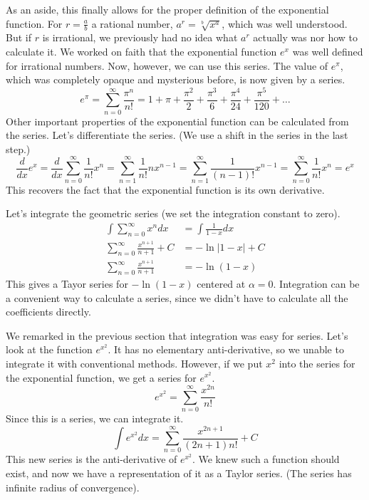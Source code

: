 \documentclass[fleqn]{report}
\begin{document}
As an aside, this finally allows for the proper definition of
the exponential function. For $r = \frac{a}{b}$ a rational
number, $a^r = \sqrt[b]{x^a}$, which was well understood. But
if $r$ is irrational, we previously had no idea what $a^r$
actually was nor how to calculate it. We worked on faith that
the exponential function $e^x$ was well defined for irrational
numbers. Now, however, we can use this series. The value of
$e^{\pi}$, which was completely opaque and mysterious before,
is now given by a series.
\begin{equation*}
e^{\pi} = \sum_{n=0}^\infty \frac{\pi^n}{n!} = 1 + \pi +
\frac{\pi^2}{2} + \frac{\pi^3}{6} + \frac{\pi^4}{24} +
\frac{\pi^5}{120} + \ldots
\end{equation*}
Other important properties of the exponential function can be
calculated from the series. Let's differentiate the series. (We
use a shift in the series in the last step.)
\begin{equation*}
\frac{d}{dx} e^x = \frac{d}{dx} \sum_{n=0}^\infty \frac{1}{n!}
x^n = \sum_{n=1}^\infty \frac{1}{n!} n x^{n-1} =
\sum_{n=1}^\infty \frac{1}{(n-1)!} x^{n-1} = \sum_{n=0}^\infty
\frac{1}{n!} x^n = e^x
\end{equation*}
This recovers the fact that the exponential function is its own
derivative.

\begin{example}
Let's integrate the geometric series (we set the integration
constant to zero).
\begin{align*}
\int \sum_{n=0}^\infty x^n dx & = \int \frac{1}{1-x} dx \\
\sum_{n=0}^\infty \frac{x^{n+1}}{n+1} + C & = -\ln |1-x| + C \\
\sum_{n=0}^\infty \frac{x^{n+1}}{n+1} 
& = -\ln (1-x) 
\end{align*}
This gives a Tayor series for $- \ln (1-x)$ centered at
$\alpha = 0$. Integration can be a convenient way to calculate a
series, since we didn't have to calculate all the coefficients
directly.
\end{example}

\begin{example}
We remarked in the previous section that integration was easy
for series. Let's look at the function $e^{x^2}$. It has no
elementary anti-derivative, so we unable to integrate it with
conventional methods. However, if we put $x^2$ into the series
for the exponential function, we get a series for $e^{x^2}$.
\begin{equation*}
e^{x^2} = \sum_{n=0}^\infty \frac{x^{2n}}{n!}
\end{equation*}
Since this is a series, we can integrate it.
\begin{equation*}
\int e^{x^2} dx = \sum_{n=0}^\infty \frac{x^{2n+1}}{(2n+1)n!} +
C
\end{equation*}
This new series is the anti-derivative of $e^{x^2}$. We knew
such a function should exist, and now we have a
representation of it as a Taylor series. (The series has
infinite radius of convergence). 
\end{example}
\end{document}
